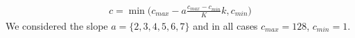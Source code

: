 \begin{align}
	c =\min\bigg(c_{max} - a \frac{ c_{max} - c_{min}}{K}k, c_{min} \bigg)
\end{align}
We considered the slope $a=\{2,3,4,5,6,7\}$ and in all cases $c_{max}=128$, $c_{min}=1$. 

